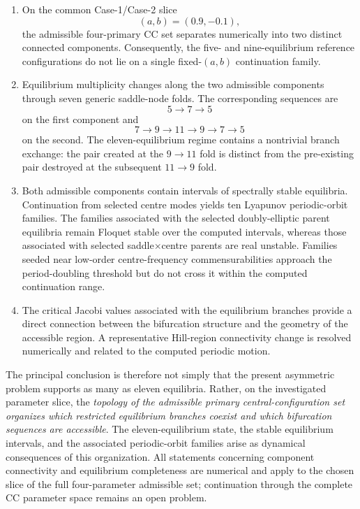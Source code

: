 \begin{enumerate}

\item On the common Case-1/Case-2 slice
\[
(a,b)=(0.9,-0.1),
\]
the admissible four-primary CC set separates numerically into two distinct
connected components. Consequently, the five- and nine-equilibrium reference
configurations do not lie on a single fixed-$(a,b)$ continuation family.

\item Equilibrium multiplicity changes along the two admissible components
through seven generic saddle-node folds. The corresponding sequences are
\[
5\rightarrow7\rightarrow5
\]
on the first component and
\[
7\rightarrow9\rightarrow11\rightarrow9\rightarrow7\rightarrow5
\]
on the second. The eleven-equilibrium regime contains a nontrivial branch
exchange: the pair created at the $9\rightarrow11$ fold is distinct from the
pre-existing pair destroyed at the subsequent $11\rightarrow9$ fold.

\item Both admissible components contain intervals of spectrally stable
equilibria. Continuation from selected centre modes yields ten Lyapunov
periodic-orbit families. The families associated with the selected
doubly-elliptic parent equilibria remain Floquet stable over the computed
intervals, whereas those associated with selected saddle$\times$centre parents
are real unstable. Families seeded near low-order centre-frequency
commensurabilities approach the period-doubling threshold but do not cross it
within the computed continuation range.

\item The critical Jacobi values associated with the equilibrium branches
provide a direct connection between the bifurcation structure and the
geometry of the accessible region. A representative Hill-region connectivity
change is resolved numerically and related to the computed periodic motion.

\end{enumerate}
The principal conclusion is therefore not simply that the present asymmetric problem supports as many as eleven equilibria. Rather, on the investigated parameter slice, the \emph{topology of the admissible primary central-configuration set organizes which restricted equilibrium branches coexist and which bifurcation sequences are accessible}. The eleven-equilibrium state, the stable equilibrium intervals, and the associated periodic-orbit families arise as dynamical consequences of this organization. All statements concerning component connectivity and equilibrium completeness are numerical and apply to the chosen slice of the full four-parameter admissible set; continuation through the complete CC parameter space remains an open problem. 